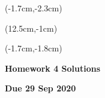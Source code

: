 \documentclass[12pt, oneside]{article}
\begin{document}
\begin{textblock*}{4cm}(-1.7cm,-2.3cm)
\end{textblock*}

\begin{textblock*}{8cm}(12.5cm,-1cm)
\end{textblock*}
\begin{textblock*}{13.5cm}(-1.7cm,-1.8cm)
\end{textblock*}

\vspace{1cm}

\begin{center}
\textbf{\Large Homework 4 Solutions}

\textbf{Due 29 Sep 2020}
\end{center}
\end{document}
